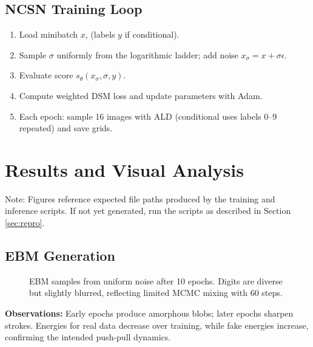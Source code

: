 \documentclass[a4paper,12pt]{article}
\begin{document}
\subsection{NCSN Training Loop}
\begin{enumerate}[leftmargin=*]
    \item Load minibatch $x$, (labels $y$ if conditional).
    \item Sample $\sigma$ uniformly from the logarithmic ladder; add noise $x_\sigma = x + \sigma \epsilon$.
    \item Evaluate score $s_\theta(x_\sigma, \sigma, y)$.
    \item Compute weighted DSM loss and update parameters with Adam.
    \item Each epoch: sample 16 images with ALD (conditional uses labels 0--9 repeated) and save grids.
\end{enumerate}

\section{Results and Visual Analysis}
Note: Figures reference expected file paths produced by the training and inference scripts. If not yet generated, run the scripts as described in Section \ref{sec:repro}.

\subsection{EBM Generation}
\begin{figure}[H]
    \centering
    \caption{EBM samples from uniform noise after 10 epochs. Digits are diverse but slightly blurred, reflecting limited MCMC mixing with 60 steps.}
    \label{fig:ebm_samples}
\end{figure}
\textbf{Observations:} Early epochs produce amorphous blobs; later epochs sharpen strokes. Energies for real data decrease over training, while fake energies increase, confirming the intended push-pull dynamics.
\end{document}
